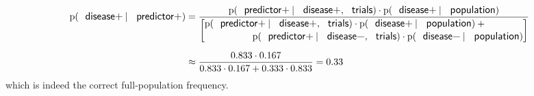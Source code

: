 \documentclass[utf8]{FrontiersinHarvard} %
\newcommand*{\p}{\mathrm{p}}%
\renewcommand*{\|}[1][]{\nonscript\:#1\vert\nonscript\:\mathopen{}}
\begin{document}
\begin{equation}
  \label{eq:base-rate_correction_example}
 \begin{split}
   \p(\textsf{\small disease+} \| \textsf{\small predictor+})
   &=
  \frac{
    \p(\textsf{\small predictor+} \| \textsf{\small disease+},
  \textsf{\small trials})
  \cdot   \p(\textsf{\small disease+} \| \textsf{\small population})
}{
  \biggl[\begin{aligned}
    &\p(\textsf{\small predictor+} \| \textsf{\small disease+},
  \textsf{\small trials}) 
  \cdot   \p(\textsf{\small disease+} \| \textsf{\small population})
  +{}\\[-0.5\jot]&\hspace{5em}
    \p(\textsf{\small predictor+} \| \textsf{\small disease\textminus},
  \textsf{\small trials})
  \cdot   \p(\textsf{\small disease\textminus} \| \textsf{\small population})
\end{aligned}\biggr]
} \\[2\jot]
&\approx
  \frac{ 0.833 \cdot 0.167}{0.833 \cdot 0.167 + 0.333 \cdot 0.833}
  = 0.33
  \end{split}
\end{equation}
which is indeed the correct full-population frequency.
\end{document}
